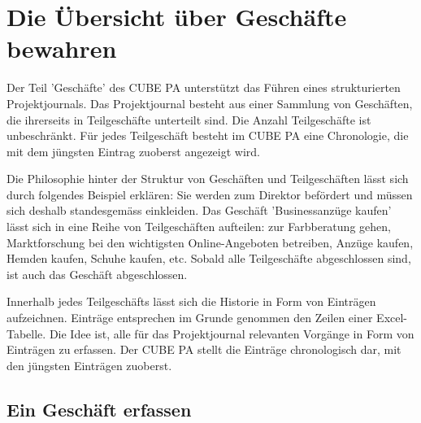 
\clearpage
\section{Die Übersicht über Geschäfte bewahren}

Der Teil 'Geschäfte' des CUBE PA unterstützt das Führen eines strukturierten Projektjournals. Das Projektjournal besteht aus einer Sammlung von Geschäften, die ihrerseits in Teilgeschäfte unterteilt sind. Die Anzahl Teilgeschäfte ist unbeschränkt. Für jedes Teilgeschäft besteht im CUBE PA eine Chronologie, die mit dem jüngsten Eintrag zuoberst angezeigt wird.

\vspace{\baselineskip}

Die Philosophie hinter der Struktur von Geschäften und Teilgeschäften lässt sich durch folgendes Beispiel erklären: Sie werden zum Direktor befördert und müssen sich deshalb standesgemäss einkleiden. Das Geschäft 'Businessanzüge kaufen' lässt sich in eine Reihe von Teilgeschäften aufteilen: zur Farbberatung gehen,
Marktforschung bei den wichtigsten Online-Angeboten betreiben, Anzüge kaufen, Hemden kaufen, Schuhe kaufen, etc. Sobald alle Teilgeschäfte abgeschlossen sind, ist auch das Geschäft abgeschlossen.

\vspace{\baselineskip}

Innerhalb jedes Teilgeschäfts lässt sich die Historie in Form von Einträgen aufzeichnen. Einträge entsprechen im Grunde genommen den Zeilen einer Excel-Tabelle. Die Idee ist, alle für das Projektjournal relevanten Vorgänge in Form von Einträgen zu erfassen. Der CUBE PA stellt die Einträge chronologisch dar, mit den jüngsten Einträgen zuoberst.

\subsection{Ein Geschäft erfassen}

